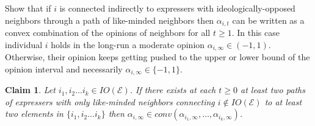 \documentclass{article}
\newtheorem{claim}{Claim}
\begin{document}
 Show that if $i$ is connected indirectly to expressers with ideologically-opposed neighbors through a path of like-minded neighbors then $\alpha_{i,t}$ can be written as a convex combination of the opinions of neighbors for all $t \geq 1$. In this case individual $i$ holds in the long-run a moderate opinion $\alpha_{i,\infty} \in (-1,1)$. Otherwise, their opinion keeps getting pushed to the upper or lower bound of the opinion interval and necessarily $\alpha_{i,\infty} \in \{-1,1\}$.  \\ 

\begin{claim} Let $i_1, i_2 \ldots i_k \in IO(\mathcal{E})$. If there exists at each $t \geq 0$ at least two paths of expressers with only like-minded neighbors connecting $i \not \in IO(\mathcal{E})$ to at least two elements in $\{ i_1, i_2 \ldots i_k\}$ then $\alpha_{i,\infty} \in {conv}{(\alpha_{i_1,\infty} , \ldots , \alpha_{i_k,\infty} )}$.
\end{claim}
\end{document}
